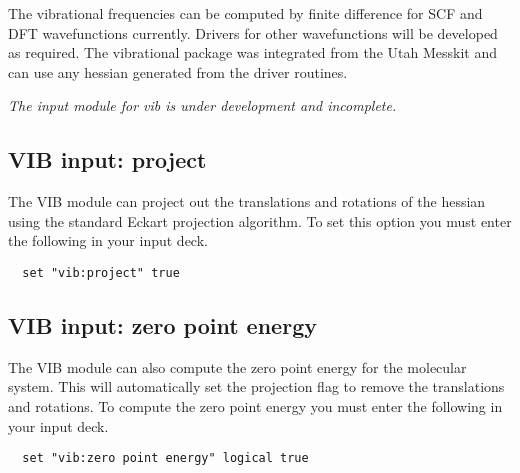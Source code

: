 The vibrational frequencies can be computed by finite difference for
SCF and DFT wavefunctions currently.  Drivers for other wavefunctions
will be developed as required.  The vibrational package was integrated
from the Utah Messkit and can use any hessian generated from the
driver routines.

{\it The input module for vib is under development and incomplete.}

\subsection{VIB input: project}

The VIB module can project out the translations and rotations of the
hessian using the standard Eckart projection algorithm.  To set this
option you must enter the following in your input deck.

\begin{verbatim}
  set "vib:project" true
\end{verbatim}

\subsection{VIB input: zero point energy}

The VIB module can also compute the zero point energy for the
molecular system.  This will automatically set the projection flag to
remove the translations and rotations.   To compute the zero point energy
you must enter the following in your input deck.

\begin{verbatim}
  set "vib:zero point energy" logical true
\end{verbatim}

